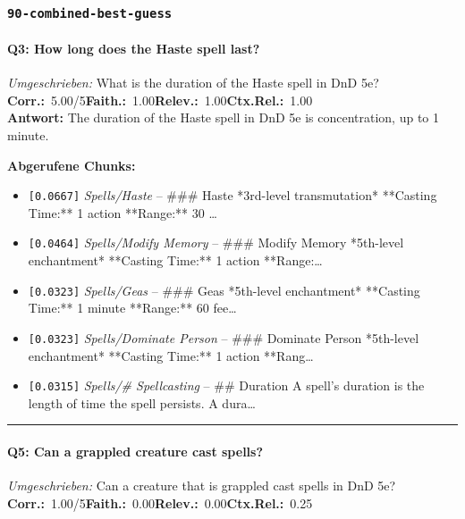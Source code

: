 \subsubsection*{\texttt{90-combined-best-guess}}
\label{app:samples:90_combined_best_guess}

\paragraph{Q3: How long does the Haste spell last?}
\textit{Umgeschrieben:} What is the duration of the Haste spell in DnD 5e?\\[2pt]
\noindent \textbf{Corr.:}~5.00/5\quad \textbf{Faith.:}~1.00\quad \textbf{Relev.:}~1.00\quad \textbf{Ctx.Rel.:}~1.00\\

\noindent\textbf{Antwort:} The duration of the Haste spell in DnD 5e is concentration, up to 1 minute.

\noindent\textbf{Abgerufene Chunks:}
\begin{itemize}[noitemsep, topsep=2pt]
  \item[\textbf{\#1}] \texttt{[0.0667]} \textit{Spells/Haste} -- \#\#\# Haste  *3rd-level transmutation*  **Casting Time:** 1 action  **Range:** 30 \ldots
  \item[\textbf{\#2}] \texttt{[0.0464]} \textit{Spells/Modify Memory} -- \#\#\# Modify Memory  *5th-level enchantment*  **Casting Time:** 1 action  **Range:\ldots
  \item[\textbf{\#3}] \texttt{[0.0323]} \textit{Spells/Geas} -- \#\#\# Geas  *5th-level enchantment*  **Casting Time:** 1 minute  **Range:** 60 fee\ldots
  \item[\textbf{\#4}] \texttt{[0.0323]} \textit{Spells/Dominate Person} -- \#\#\# Dominate Person  *5th-level enchantment*  **Casting Time:** 1 action  **Rang\ldots
  \item[\textbf{\#5}] \texttt{[0.0315]} \textit{Spells/# Spellcasting} -- \#\# Duration  A spell's duration is the length of time the spell persists. A dura\ldots
\end{itemize}
\vspace{4pt}
\hrule
\vspace{6pt}

\paragraph{Q5: Can a grappled creature cast spells?}
\textit{Umgeschrieben:} Can a creature that is grappled cast spells in DnD 5e?\\[2pt]
\noindent \textbf{Corr.:}~1.00/5\quad \textbf{Faith.:}~0.00\quad \textbf{Relev.:}~0.00\quad \textbf{Ctx.Rel.:}~0.25\\

